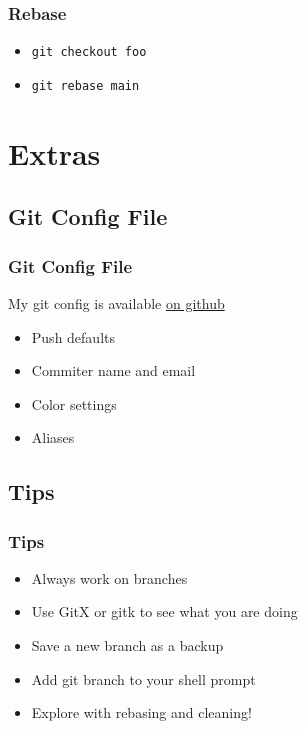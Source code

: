 \begin{frame}
  \frametitle{Rebase}
  \begin{itemize}
    \item \texttt{git checkout foo}
    \item \texttt{git rebase main}
  \end{itemize}
   { }
   { }
\end{frame}

\section{Extras}

\subsection{Git Config File}

\begin{frame}
  \frametitle{Git Config File}
  My git config is available \href{https://github.com/kelsin/dotfiles/blob/main/main/.gitconfig}{on github}
  \begin{itemize}
    \item Push defaults
    \item Commiter name and email
    \item Color settings
    \item Aliases
  \end{itemize}
\end{frame}

\subsection{Tips}

\begin{frame}
  \frametitle{Tips}
  \begin{itemize}
    \item Always work on branches
      \pause
    \item Use GitX or gitk to see what you are doing
      \pause
    \item Save a new branch as a backup
      \pause
    \item Add git branch to your shell prompt
      \pause
    \item Explore with rebasing and cleaning!
  \end{itemize}
\end{frame}


